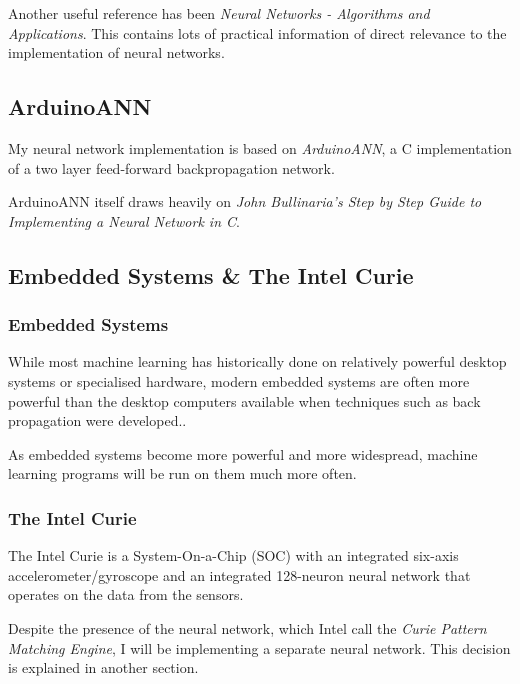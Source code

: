 \documentclass[a4paper]{article}
\begin{document}
Another useful reference has been \textit{Neural Networks - Algorithms and Applications}\cite{bgref2}. This contains lots of practical information of direct relevance to the implementation of neural networks.

\subsection{ArduinoANN}%

My neural network implementation is based on \textit{ArduinoANN}\cite{bgref3}, a C implementation of a two layer feed-forward backpropagation network. 

ArduinoANN itself draws heavily on \textit{John Bullinaria's Step by Step Guide to Implementing a Neural Network in C}\cite{bgref4}.

\subsection{Embedded Systems \& The Intel Curie}%

\subsubsection{Embedded Systems}

While most machine learning has historically done on relatively powerful desktop systems or specialised hardware, modern embedded systems are often more powerful than the desktop computers available when techniques such as back propagation were developed.\cite{bgref5}. 

As embedded systems become more powerful and more widespread, machine learning programs will be run on them much more often.

\subsubsection{The Intel Curie}

The Intel Curie is a System-On-a-Chip (SOC) with an integrated six-axis accelerometer/gyroscope and an integrated 128-neuron neural network that operates on the data from the sensors.

Despite the presence of the neural network, which Intel call the \textit{Curie Pattern Matching Engine}\cite{bgref6}, I will be implementing a separate neural network. This decision is explained in another section. 
\end{document}
